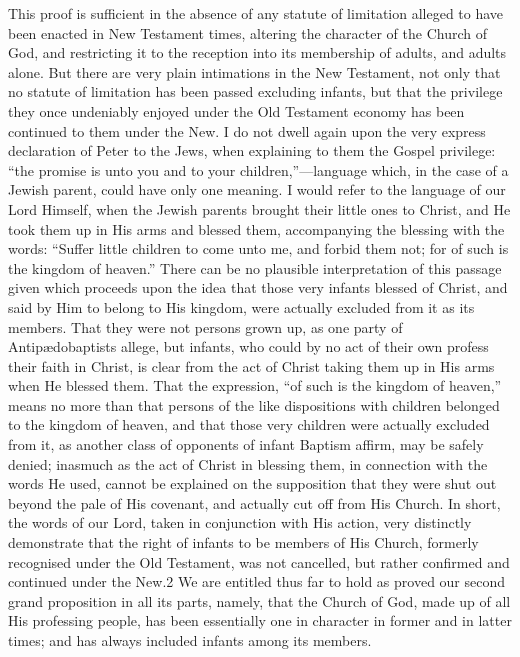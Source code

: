 \documentclass[]{book}
\begin{document}
This proof is sufficient in the absence of any statute of limitation alleged to have been enacted in New Testament times, altering the character of the Church of God, and restricting it to the reception into its membership of adults, and adults alone. But there are very plain intimations in the New Testament, not only that no statute of limitation has been passed excluding infants, but that the privilege they once undeniably enjoyed under the Old Testament economy has been continued to them under the New. I do not dwell again upon the very express declaration of Peter to the Jews, when explaining to them the Gospel privilege: ``the promise is unto you and to your children,''---language which, in the case of a Jewish parent, could have only one meaning. I would refer to the language of our Lord Himself, when the Jewish parents brought their little ones to Christ, and He took them up in His arms and blessed them, accompanying the blessing with the words: ``Suffer little children to come unto me, and forbid them not; for of such is the kingdom of heaven.'' There can be no plausible interpretation of this passage given which proceeds upon the idea that those very infants blessed of Christ, and said by Him to belong to His kingdom, were actually excluded from it as its members. That they were not persons grown up, as one party of Antipædobaptists allege, but infants, who could by no act of their own profess their faith in Christ, is clear from the act of Christ taking them up in His arms when He blessed them. That the expression, ``of such is the kingdom of heaven,'' means no more than that persons of the like dispositions with children belonged to the kingdom of heaven, and that those very children were actually excluded from it, as another class of opponents of infant Baptism affirm, may be safely denied; inasmuch as the act of Christ in blessing them, in connection with the words He used, cannot be explained on the supposition that they were shut out beyond the pale of His covenant, and actually cut off from His Church. In short, the words of our Lord, taken in conjunction with His action, very distinctly demonstrate that the right of infants to be members of His Church, formerly recognised under the Old Testament, was not cancelled, but rather confirmed and continued under the New.2 We are entitled thus far to hold as proved our second grand proposition in all its parts, namely, that the Church of God, made up of all His professing people, has been essentially one in character in former and in latter times; and has always included infants among its members.
\end{document}
